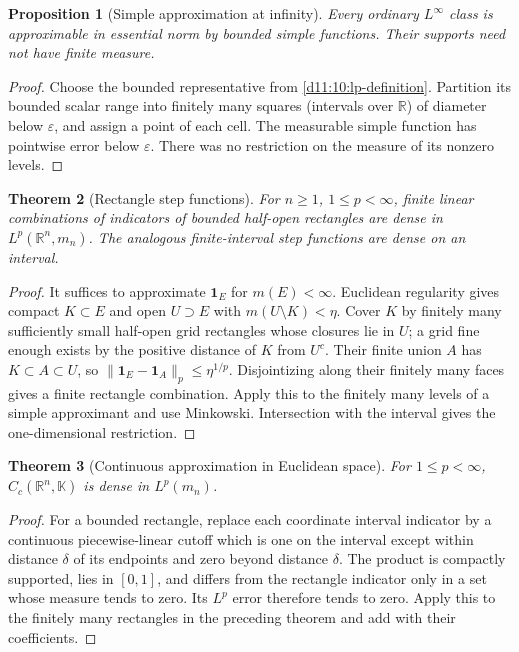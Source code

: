 \documentclass[11pt,oneside,openany]{book}
\newtheorem{theorem}{Theorem}[chapter]
\newtheorem{proposition}[theorem]{Proposition}
\theoremstyle{definition}
\theoremstyle{remark}
\newcommand{\R}{\mathbb R}\newcommand{\C}{\mathbb C}
\newcommand{\eps}{\varepsilon}\newcommand{\ee}{\varepsilon}
\newcommand{\one}{\mathbf1}\newcommand{\ind}[1]{\mathbf1_{#1}}
\newcommand{\family}[1]{}
\begin{document}
\begin{proposition}[Simple approximation at infinity]\family{D11.11.bounded_simple_infinity}\label{d11:11:bounded-simple-infinity}
Every ordinary $L^\infty$ class is approximable in essential norm by
bounded simple functions. Their supports need not have finite measure.
\end{proposition}
\begin{proof}
Choose the bounded representative from \cref{d11:10:lp-definition}.
Partition its bounded scalar range into finitely many squares (intervals
over $\R$) of diameter below $\eps$, and assign a point of each cell.
The measurable simple function has pointwise error below $\eps$.
There was no restriction on the measure of its nonzero levels.
\end{proof}

\begin{theorem}[Rectangle step functions]\family{D11.11.step_density}\label{d11:11:step-density}
For $n\geq1$, $1\leq p<\infty$, finite linear combinations of indicators
of bounded half-open rectangles are dense in $L^p(\R^n,m_n)$.
The analogous finite-interval step functions are dense on an interval.
\end{theorem}
\begin{proof}
It suffices to approximate $\one_E$ for $m(E)<\infty$. Euclidean
regularity gives compact $K\subset E$ and open $U\supset E$ with
$m(U\setminus K)<\eta$. Cover $K$ by finitely many sufficiently small
half-open grid rectangles whose closures lie in $U$; a grid fine enough
exists by the positive distance of $K$ from $U^c$. Their finite union $A$
has $K\subset A\subset U$, so
$\|\one_E-\one_A\|_p\leq\eta^{1/p}$. Disjointizing along their
finitely many faces gives a finite rectangle combination. Apply this to
the finitely many levels of a simple approximant and use Minkowski.
Intersection with the interval gives the one-dimensional restriction.
\end{proof}

\begin{theorem}[Continuous approximation in Euclidean space]\family{D11.11.cc_density_euclidean}\label{d11:11:cc-density-euclidean}
For $1\leq p<\infty$, $C_c(\R^n,\mathbb K)$ is dense in $L^p(m_n)$.
\end{theorem}
\begin{proof}
For a bounded rectangle, replace each coordinate interval indicator by a
continuous piecewise-linear cutoff which is one on the interval except
within distance $\delta$ of its endpoints and zero beyond distance
$\delta$. The product is compactly supported, lies in $[0,1]$, and differs
from the rectangle indicator only in a set whose measure tends to zero.
Its $L^p$ error therefore tends to zero. Apply this to the finitely many
rectangles in the preceding theorem and add with their coefficients.
\end{proof}
\end{document}
